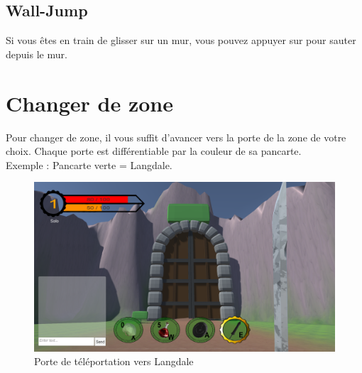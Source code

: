 \documentclass[a4paper, 11pt]{article}
\begin{document}
	\subsection{Wall-Jump}
	\noindent Si vous êtes en train de glisser sur un mur, vous pouvez appuyer sur  pour sauter depuis le mur.
	
	\section{Changer de zone}
	Pour changer de zone, il vous suffit d'avancer vers la porte de la zone de votre choix. Chaque porte est différentiable par la couleur de sa pancarte.
	\\ 
	Exemple : Pancarte verte = Langdale.
	\begin{figure}[!h]
		\centering
		\includegraphics[scale=0.3]{images/porte_langdale.png}
		\caption{Porte de téléportation vers Langdale}
	\end{figure}
\end{document}
